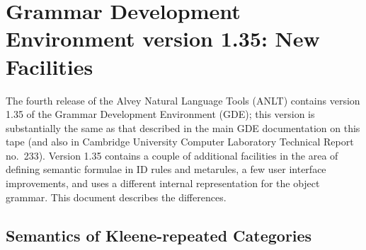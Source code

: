 %
\newenvironment{display}%
   {\begin{center}
    \begin{minipage}[t]{5.4in}}%
   {\end{minipage}
    \end{center}}
%
\newenvironment{ex}%
   {\begin{display}}%
   {\end{display}}
%
 
\appendix
\setcounter{chapter}{4}
\chapter{Grammar Development Environment version 1.35: New Facilities}

The fourth release of the Alvey Natural Language Tools (ANLT) contains
version 1.35 of the Grammar Development Environment (GDE); this
version is substantially the same as that
described in the main GDE documentation on this tape (and also in
Cambridge University Computer Laboratory Technical Report no.\ 233). 
Version 1.35 contains a couple of additional facilities in the area of
defining semantic formulae in ID rules and metarules, a few user interface
improvements, and uses a different internal representation for the object
grammar. This document describes the differences.


\section*{Semantics of Kleene-repeated Categories}

